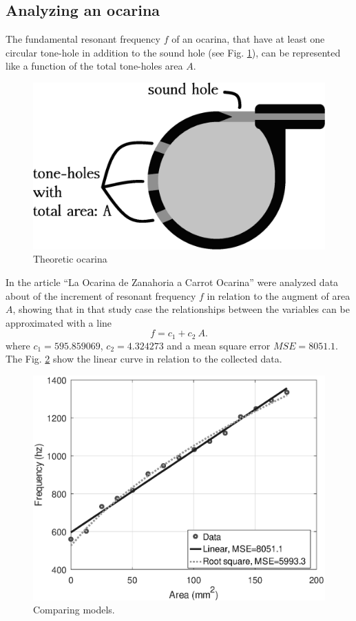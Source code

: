 \documentclass[11pt,twocolumn]{article}
\begin{document}
\subsection{Analyzing an ocarina}

The fundamental resonant frequency $f$ of an ocarina, 
that have at least one circular tone-hole %
in addition to the sound hole (see Fig. \ref{fig:ocarina-teorica}),
can be represented like a function of the total tone-holes area $A$.


\begin{figure}[ht!]
\centering
\includegraphics[width=0.750\columnwidth]{ocarina-teorica.eps}
\caption{Theoretic ocarina}
\label{fig:ocarina-teorica}
\end{figure}

In the article ``La Ocarina de Zanahoria a Carrot Ocarina'' \cite{mp2010ocarina}
were analyzed data about of the increment of resonant frequency $f$ in relation to the augment of area $A$,
showing that in that study case the relationships between the variables can be approximated with a line 
\begin{equation}
f=c_1+ c_2~A.
\end{equation}
where $c_1=595.859069$, $c_2=4.324273$ and a mean square error $MSE=8051.1$.
The Fig. \ref{fig:models} show the linear curve in relation to the collected data.


\begin{figure}[ht!]
\centering
\includegraphics[width=0.850\columnwidth]{compara.eps}
\caption{Comparing models. }
\label{fig:models}
\end{figure}
\end{document}

